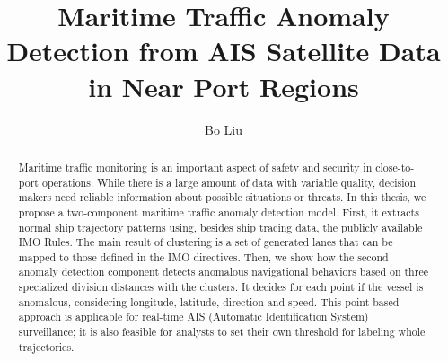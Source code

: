 \documentclass[12pt,glossary]{dalcsthesis}
\begin{document}
\mcs  %
\title{Maritime Traffic Anomaly Detection from AIS Satellite Data in Near Port Regions}
\author{Bo Liu}




\frontmatter



\begin{abstract}
Maritime traffic monitoring is an important aspect of safety and security in close-to-port operations. While there is a large amount of data with variable quality, decision makers need reliable information about possible situations or threats. In this thesis, we propose a two-component maritime traffic anomaly detection model. First, it extracts normal ship trajectory patterns using, besides ship tracing data, the publicly available IMO Rules. The main result of clustering is a set of generated lanes that can be mapped to those defined in the IMO directives. Then, we show how the second anomaly detection component detects anomalous navigational behaviors based on three specialized division distances with the clusters. It decides for each point if the vessel is anomalous, considering longitude, latitude, direction and speed. This point-based approach is applicable for real-time AIS (Automatic Identification System) surveillance; it is also feasible for analysts to set their own threshold for labeling whole trajectories.


\end{abstract}
\end{document}
